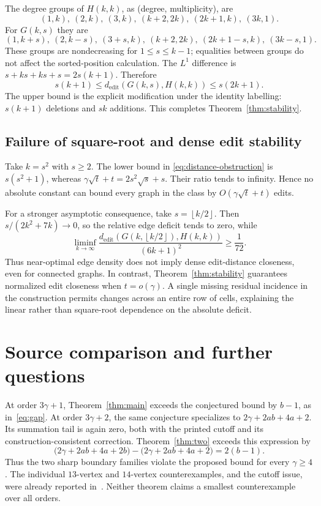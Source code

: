 \documentclass[11pt]{article}
\theoremstyle{definition}
\theoremstyle{remark}
\newcommand{\floor}[1]{\left\lfloor#1\right\rfloor}
\begin{document}
The degree groups of $H(k,k)$, as (degree, multiplicity), are
\[
 (1,k),\ (2,k),\ (3,k),\ (k+2,2k),\ (2k+1,k),\ (3k,1).
\]
For $G(k,s)$ they are
\[
 (1,k+s),\ (2,k-s),\ (3+s,k),\ (k+2,2k),\
 (2k+1-s,k),\ (3k-s,1).
\]
These groups are nondecreasing for $1\le s\le k-1$; equalities between
groups do not affect the sorted-position calculation. The $L^1$
difference is $s+ks+ks+s=2s(k+1)$. Therefore
\begin{equation}\label{eq:distance-obstruction}
 s(k+1)\le d_{\mathrm{edit}}(G(k,s),H(k,k))\le s(2k+1).
\end{equation}
The upper bound is the explicit modification under the identity
labelling: $s(k+1)$ deletions and $sk$ additions.
This completes Theorem~\ref{thm:stability}.

\subsection{Failure of square-root and dense edit stability}

Take $k=s^2$ with $s\ge2$. The lower bound in
\eqref{eq:distance-obstruction} is $s(s^2+1)$, whereas
$\gamma\sqrt t+t=2s^2\sqrt s+s$. Their ratio tends to infinity.
Hence no absolute constant can bound every graph in the class by
$O(\gamma\sqrt t+t)$ edits.

For a stronger asymptotic consequence, take $s=\floor{k/2}$.
Then $s/(2k^2+7k)\to0$, so the relative edge deficit tends to zero, while
\[
 \liminf_{k\to\infty}
 \frac{d_{\mathrm{edit}}(G(k,\floor{k/2}),H(k,k))}{(6k+1)^2}
 \ge\frac1{72}.
\]
Thus near-optimal edge density does not imply dense edit-distance
closeness, even for connected graphs. In contrast,
Theorem~\ref{thm:stability} guarantees normalized edit closeness when
$t=o(\gamma)$. A single missing residual incidence in the construction
permits changes across an entire row of cells, explaining the linear
rather than square-root dependence on the absolute deficit.

\section{Source comparison and further questions}

At order $3\gamma+1$, Theorem~\ref{thm:main} exceeds the conjectured bound
by $b-1$, as in~\eqref{eq:gap}. At order $3\gamma+2$, the same conjecture
specializes to $2\gamma+2ab+4a+2$. Its summation tail is again zero, both
with the printed cutoff and its construction-consistent correction.
Theorem~\ref{thm:two} exceeds this expression by
\[
 \bigl(2\gamma+2ab+4a+2b\bigr)
       -\bigl(2\gamma+2ab+4a+2\bigr)=2(b-1).
\]
Thus the two sharp boundary families violate the proposed bound for every
$\gamma\ge4$. The individual $13$-vertex and $14$-vertex counterexamples,
and the cutoff issue, were already reported in~\cite{E}. Neither theorem
claims a smallest counterexample over all orders.
\end{document}
